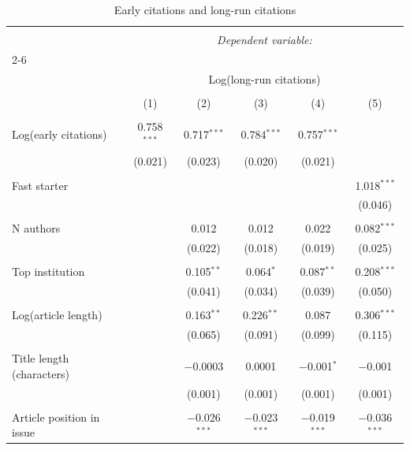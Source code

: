 
\begin{table}[!htbp] \centering 
  \caption{Early citations and long-run citations} 
  \label{tab:main} 
\begin{tabular}{@{\extracolsep{5pt}}lccccc} 
\\[-1.8ex]\hline 
\hline \\[-1.8ex] 
 & \multicolumn{5}{c}{\textit{Dependent variable:}} \\ 
\cline{2-6} 
\\[-1.8ex] & \multicolumn{5}{c}{Log(long-run citations)} \\ 
\\[-1.8ex] & (1) & (2) & (3) & (4) & (5)\\ 
\hline \\[-1.8ex] 
 Log(early citations) & 0.758$^{***}$ & 0.717$^{***}$ & 0.784$^{***}$ & 0.757$^{***}$ &  \\ 
  & (0.021) & (0.023) & (0.020) & (0.021) &  \\ 
  & & & & & \\ 
 Fast starter &  &  &  &  & 1.018$^{***}$ \\ 
  &  &  &  &  & (0.046) \\ 
  & & & & & \\ 
 N authors &  & 0.012 & 0.012 & 0.022 & 0.082$^{***}$ \\ 
  &  & (0.022) & (0.018) & (0.019) & (0.025) \\ 
  & & & & & \\ 
 Top institution &  & 0.105$^{**}$ & 0.064$^{*}$ & 0.087$^{**}$ & 0.208$^{***}$ \\ 
  &  & (0.041) & (0.034) & (0.039) & (0.050) \\ 
  & & & & & \\ 
 Log(article length) &  & 0.163$^{**}$ & 0.226$^{**}$ & 0.087 & 0.306$^{***}$ \\ 
  &  & (0.065) & (0.091) & (0.099) & (0.115) \\ 
  & & & & & \\ 
 Title length (characters) &  & $-$0.0003 & 0.0001 & $-$0.001$^{*}$ & $-$0.001 \\ 
  &  & (0.001) & (0.001) & (0.001) & (0.001) \\ 
  & & & & & \\ 
 Article position in issue &  & $-$0.026$^{***}$ & $-$0.023$^{***}$ & $-$0.019$^{***}$ & $-$0.036$^{***}$ \\ 

\end{tabular}
\end{table}
